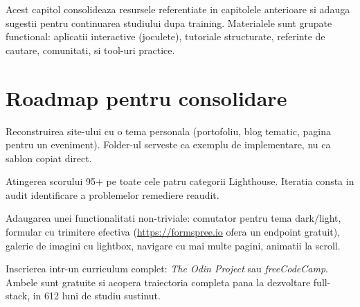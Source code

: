 \clearpage
{}
\setcounter{section}{0}
{}

Acest capitol consolideaza resursele referentiate in capitolele anterioare si adauga sugestii pentru continuarea studiului dupa training. Materialele sunt grupate functional: aplicatii interactive (joculete), tutoriale structurate, referinte de cautare, comunitati, si tool-uri practice.

\bigskip

\section{Roadmap pentru consolidare}

\begin{nota}[Saptamana 1]
Reconstruirea site-ului cu o tema personala (portofoliu, blog tematic, pagina pentru un eveniment). Folder-ul  serveste ca exemplu de implementare, nu ca sablon copiat direct.
\end{nota}

\begin{nota}[Saptamana 2]
Atingerea scorului 95+ pe toate cele patru categorii Lighthouse. Iteratia consta in audit \textendash{} identificare a problemelor \textendash{} remediere \textendash{} reaudit.
\end{nota}

\begin{nota}
Adaugarea unei functionalitati non-triviale: comutator pentru tema dark/light, formular cu trimitere efectiva (\url{https://formspree.io} ofera un endpoint gratuit), galerie de imagini cu lightbox, navigare cu mai multe pagini, animatii la scroll.
\end{nota}

\begin{nota}
Inscrierea intr-un curriculum complet: \emph{The Odin Project} sau \emph{freeCodeCamp}. Ambele sunt gratuite si acopera traiectoria completa pana la dezvoltare full-stack, in 6\textendash{}12 luni de studiu sustinut.
\end{nota}

